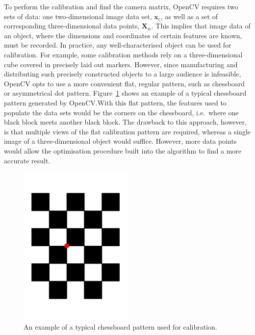To perform the calibration and find the camera matrix, OpenCV requires two sets of data: one two-dimensional image data set, $\bm{x}_c$, as well as a set of corresponding three-dimensional data points, $\bm{X}_w$. This implies that image data of an object, where the dimensions and coordinates of certain features are known, must be recorded. In practice, any well-characterised object can be used for calibration. For example, some calibration methods rely on a three-dimensional cube covered in precisely laid out markers. However, since manufacturing and distributing such precisely constructed objects to a large audience is infeasible, OpenCV opts to use a more convenient flat, regular pattern, such as chessboard or asymmetrical dot pattern. Figure~\ref{fig:chap2-calib-pattern} shows an example of a typical chessboard pattern generated by OpenCV.\@ With this flat pattern, the features used to populate the data sets would be the corners on the chessboard, i.e.\ where one black block meets another black block. The drawback to this approach, however, is that multiple views of the flat calibration pattern are required, whereas a single image of a three-dimensional object would suffice. However, more data points would allow the optimisation procedure built into the algorithm to find a more accurate result.  

\begin{figure}
  \centering
  \includegraphics[angle=90, width=0.5\textwidth]{figures/chapter2/chessboard_pattern}
  \caption{An example of a typical chessboard pattern used for calibration.}
\label{fig:chap2-calib-pattern}
\end{figure}

